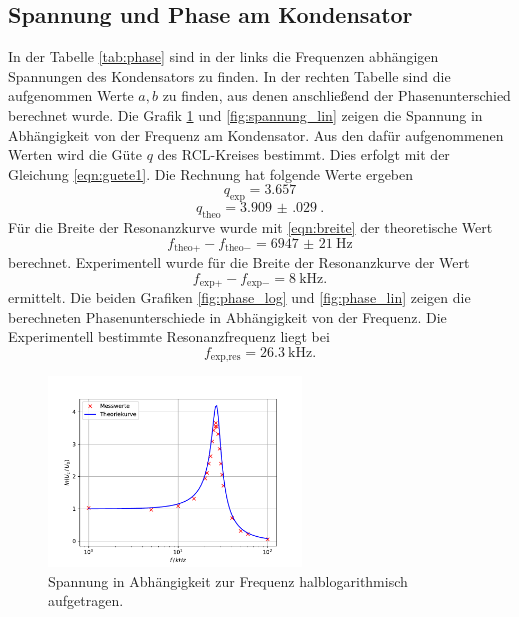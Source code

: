 \subsection{Spannung und Phase am Kondensator}
In der Tabelle \ref{tab:phase} sind in der links die Frequenzen abhängigen Spannungen des Kondensators zu finden.
In der rechten Tabelle sind die aufgenommen Werte $a, b$ zu finden, aus denen anschließend der Phasenunterschied berechnet wurde.
Die Grafik \ref{fig:spannung_log} und \ref{fig:spannung_lin} zeigen die Spannung in Abhängigkeit von der Frequenz am Kondensator.
Aus den dafür aufgenommenen Werten wird die Güte $q$ des RCL-Kreises bestimmt.
Dies erfolgt mit der Gleichung \eqref{eqn:guete1}. Die Rechnung hat folgende Werte ergeben
\begin{equation*}
    q_\text{exp} = 3.657
\end{equation*}
\begin{equation*}
    q_\text{theo} =  \SI{3.909(029)}{}.
\end{equation*}
Für die Breite der Resonanzkurve wurde mit \eqref{eqn:breite} der theoretische Wert 
\begin{equation*}
    f_{\text{theo}+}- f_{\text{theo}-} = \SI{6947(21)}{\hertz}
\end{equation*}
berechnet.
Experimentell wurde für die Breite der Resonanzkurve der Wert 
\begin{equation*}
    f_{\text{exp}+}-f_{\text{exp}-} = \SI{8}{\kilo\hertz}.
\end{equation*}
ermittelt.
Die beiden Grafiken \ref{fig:phase_log} und \ref{fig:phase_lin} zeigen die berechneten Phasenunterschiede in Abhängigkeit von der Frequenz.
Die Experimentell bestimmte Resonanzfrequenz liegt bei 
\begin{equation*}
    f_{\text{exp},\text{res}} = \SI{26.3}{\kilo\hertz}.
\end{equation*}

\begin{figure}
    \centering
    \includegraphics[width=0.6\textwidth]{content/data/plotc.pdf}
    \caption{Spannung in Abhängigkeit zur Frequenz halblogarithmisch aufgetragen.}
    \label{fig:spannung_log}
\end{figure}

